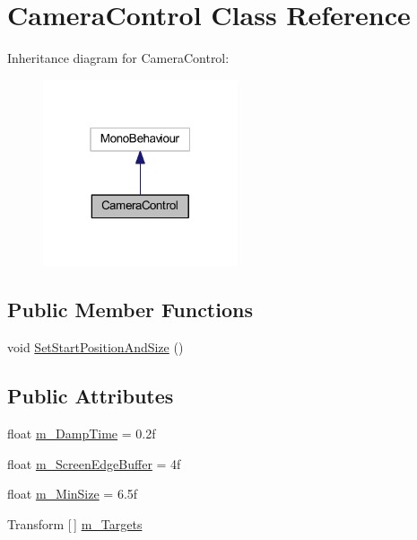 \hypertarget{class_camera_control}{}\section{Camera\+Control Class Reference}
\label{class_camera_control}


Inheritance diagram for Camera\+Control\+:
\nopagebreak
\begin{figure}[H]
\begin{center}
\leavevmode
\includegraphics[width=163pt]{class_camera_control__inherit__graph}
\end{center}
\end{figure}
\subsection*{Public Member Functions}
\begin{DoxyCompactItemize}
\item 
void \hyperlink{class_camera_control_ae9cc28818b70f48ef7fbb8cbad8e0d5f}{Set\+Start\+Position\+And\+Size} ()
\end{DoxyCompactItemize}
\subsection*{Public Attributes}
\begin{DoxyCompactItemize}
\item 
float \hyperlink{class_camera_control_addb68bd79aebb97a8611c7cf063ad8cf}{m\+\_\+\+Damp\+Time} = 0.\+2f
\item 
float \hyperlink{class_camera_control_aabb1255be1a2f913fd69db9c75d3be5d}{m\+\_\+\+Screen\+Edge\+Buffer} = 4f
\item 
float \hyperlink{class_camera_control_a71b56d132918e2c7ff36d1a273eac03b}{m\+\_\+\+Min\+Size} = 6.\+5f
\item 
Transform \mbox{[}$\,$\mbox{]} \hyperlink{class_camera_control_af7c531a124be556f16f7b531ec588037}{m\+\_\+\+Targets}
\end{DoxyCompactItemize}



